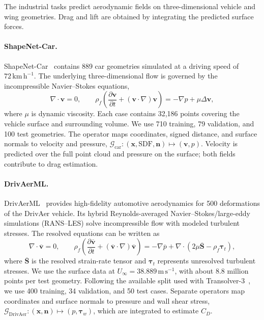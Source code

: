 The industrial tasks predict aerodynamic fields on three-dimensional vehicle and wing geometries. Drag and lift are obtained by integrating the predicted surface forces.

\paragraph{ShapeNet-Car.}
ShapeNet-Car~\citep{umetani2018learning,wu2024transolver} contains 889 car geometries simulated at a driving speed of $72\,\mathrm{km\,h^{-1}}$. The underlying three-dimensional flow is governed by the incompressible Navier--Stokes equations,
\begin{equation}
    \nabla\!\cdot\mathbf{v}=0,
    \qquad
    \rho_f\left(\frac{\partial\mathbf{v}}{\partial t}
    +(\mathbf{v}\!\cdot\nabla)\mathbf{v}\right)
    =-\nabla p+\mu\Delta\mathbf{v},
    \label{eq:app_shapenet_car}
\end{equation}
where $\mu$ is dynamic viscosity. Each case contains 32,186 points covering the vehicle surface and surrounding volume. We use 710 training, 79 validation, and 100 test geometries. The operator maps coordinates, signed distance, and surface normals to velocity and pressure, $\mathcal{G}_{\mathrm{car}}:(\mathbf{x},\mathrm{SDF},\mathbf{n})\mapsto(\mathbf{v},p)$. Velocity is predicted over the full point cloud and pressure on the surface; both fields contribute to drag estimation.

\paragraph{DrivAerML.}
DrivAerML~\citep{ashton2024drivaerml} provides high-fidelity automotive aerodynamics for 500 deformations of the DrivAer vehicle. Its hybrid Reynolds-averaged Navier--Stokes/large-eddy simulations (RANS--LES) solve incompressible flow with modeled turbulent stresses. The resolved equations can be written as
\begin{equation}
    \nabla\!\cdot\overline{\mathbf{v}}=0,
    \qquad
    \rho_f\left(\frac{\partial\overline{\mathbf{v}}}{\partial t}
    +(\overline{\mathbf{v}}\!\cdot\nabla)\overline{\mathbf{v}}\right)
    =-\nabla\overline{p}
    +\nabla\!\cdot\left(2\mu\overline{\mathbf{S}}-\rho_f\boldsymbol{\tau}_t\right),
    \label{eq:app_drivaerml}
\end{equation}
where $\overline{\mathbf{S}}$ is the resolved strain-rate tensor and $\boldsymbol{\tau}_t$ represents unresolved turbulent stresses. We use the surface data at $U_\infty=38.889\,\mathrm{m\,s^{-1}}$, with about 8.8 million points per test geometry. Following the available split used with Transolver-3~\citep{zhou2026transolver3}, we use 400 training, 34 validation, and 50 test cases. Separate operators map coordinates and surface normals to pressure and wall shear stress, $\mathcal{G}_{\mathrm{DrivAer}}:(\mathbf{x},\mathbf{n})\mapsto(p,\boldsymbol{\tau}_w)$, which are integrated to estimate $C_D$.

